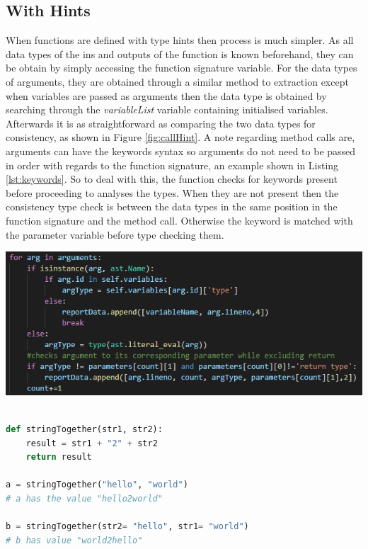 \documentclass{l4proj}
\begin{document}
\subsection{With Hints}
When functions are defined with type hints then process is much simpler. As all data types of the ins and outputs of the function is known beforehand, they can be obtain by simply accessing the function signature variable. For the data types of arguments, they are obtained through a similar method to extraction except when variables are passed as arguments then the data type is obtained by searching through the \textit{variableList} variable containing initialised variables. Afterwards it is as straightforward as comparing the two data types for consistency, as shown in Figure \ref{fig:callHint}. A note regarding method calls are, arguments can have the keywords syntax so arguments do not need to be passed in order with regards to the function signature, an example shown in Listing \ref{lst:keywords}. So to deal with this, the function checks for keywords present before proceeding to analyses the types. When they are not present then the consistency type check is between the data types in the same position in the function signature and the method call. Otherwise the keyword is matched with the parameter variable before type checking them.  

\begin{center}
    \includegraphics[width=\textwidth]{images/callHint.png}
    \label{fig:callHint}
\end{center}

\begin{lstlisting}[language=Python, caption= Method calls with/out keywords showing that order does not matter when keywords is used as the function still works, label = {lst:keywords}]

def stringTogether(str1, str2):
    result = str1 + "2" + str2
    return result
    
a = stringTogether("hello", "world")
# a has the value "hello2world"

b = stringTogether(str2= "hello", str1= "world")
# b has value "world2hello"

\end{lstlisting}
\end{document}
